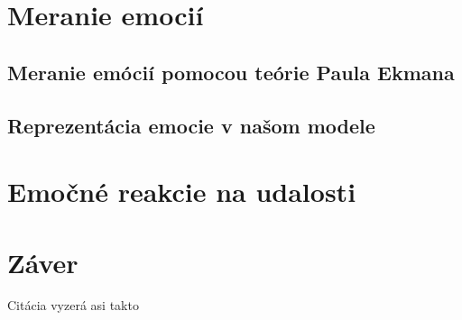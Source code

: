 \documentclass[10pt,twoside,slovak,a4paper]{article}
\begin{document}
\section{Meranie emocií}\label{meranie}

\subsection{Meranie emócií pomocou teórie Paula Ekmana}\label{meranie:ekman}
\subsection{Reprezentácia emocie v našom modele}\label{meranie:reperezentacia}

\pagebreak

\section{Emočné reakcie na udalosti}\label{reakcie}
\pagebreak

\section{Záver}\label{zaver} %
\pagebreak

Citácia vyzerá asi takto~\cite{Bicalho2020} %



\end{document}
